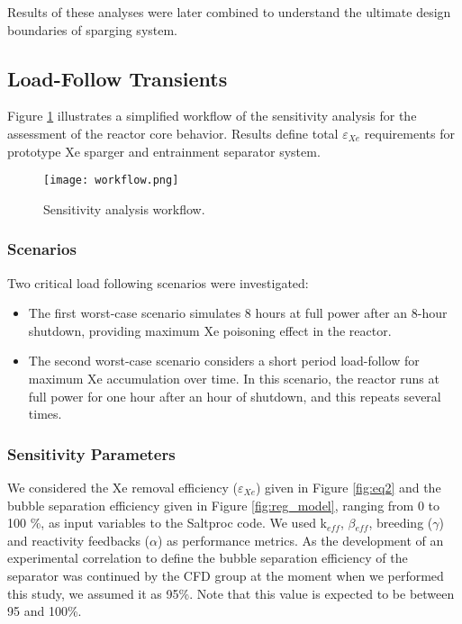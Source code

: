     Results of these analyses were later combined to understand the ultimate 
    design boundaries of sparging system.

\subsection{Load-Follow Transients}

    Figure \ref{fig:workflow} illustrates a simplified workflow of the 
    sensitivity analysis for the assessment of the reactor core behavior. 
    Results define total $\varepsilon$$_{Xe}$ requirements for prototype Xe 
    sparger and entrainment separator system.

    \begin{figure}[htbp!]
        \begin{center}
            \texttt{[image: workflow.png]}
        \end{center}
        \caption{Sensitivity analysis workflow.}
        \label{fig:workflow}
    \end{figure}

\subsubsection{Scenarios}

    Two critical load following scenarios were investigated:
    \begin{itemize}
        \item The first worst-case scenario simulates 8 hours at full power 
                after an 8-hour shutdown, providing maximum Xe poisoning effect 
                    in the reactor.
        \item The second worst-case scenario considers a short period 
                load-follow for maximum Xe accumulation over time. In this 
                    scenario, the reactor runs at full power for one hour after 
                    an hour of shutdown, and this repeats several times.
    \end{itemize}

\subsubsection{Sensitivity Parameters}

    We considered the Xe removal efficiency ($\varepsilon$$_{Xe}$) given in 
    Figure \ref{fig:eq2} and the bubble separation efficiency given in Figure 
    \ref{fig:reg_model}, ranging from 0 to 100 \%, as input variables to the 
    Saltproc code. We used k$_{eff}$, $\beta$$_{eff}$, breeding ($\gamma$) and 
    reactivity feedbacks ($\alpha$) as performance metrics. As the development 
    of an experimental correlation to define the bubble separation efficiency 
    of the separator was continued by the CFD group at the moment when we 
    performed this study, we assumed it as 95\%. Note that this value is 
    expected to be between 95 and 100\%.

